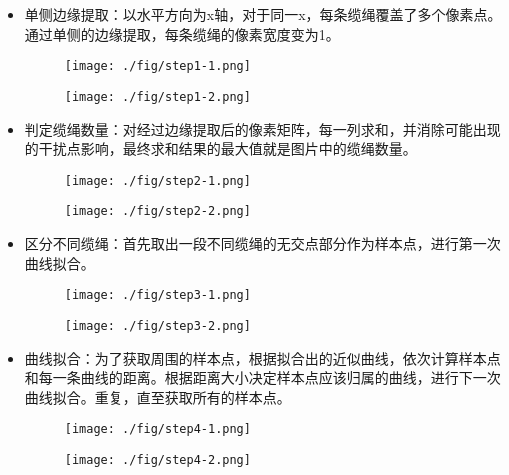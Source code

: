 \documentclass{article}
\begin{document}
\begin{itemize}
\item
  单侧边缘提取：以水平方向为x轴，对于同一x，每条缆绳覆盖了多个像素点。通过单侧的边缘提取，每条缆绳的像素宽度变为1。\\
  \begin{figure}[H]
  \begin{minipage}{0.5\linewidth}
  \centerline{\texttt{[image: ./fig/step1-1.png]}}
  \end{minipage}
  \hfill
  \begin{minipage}{0.5\linewidth}
  \centerline{\texttt{[image: ./fig/step1-2.png]}}
  \end{minipage}
  \end{figure}

\item
  判定缆绳数量：对经过边缘提取后的像素矩阵，每一列求和，并消除可能出现的干扰点影响，最终求和结果的最大值就是图片中的缆绳数量。\\
  \begin{figure}[H]
  \begin{minipage}{0.5\linewidth}
  \centerline{\texttt{[image: ./fig/step2-1.png]}}
  \end{minipage}
  \hfill
  \begin{minipage}{0.5\linewidth}
  \centerline{\texttt{[image: ./fig/step2-2.png]}}
  \end{minipage}
  \end{figure}

\item
  区分不同缆绳：首先取出一段不同缆绳的无交点部分作为样本点，进行第一次曲线拟合。\\
  \begin{figure}[H]
  \begin{minipage}{0.5\linewidth}
  \centerline{\texttt{[image: ./fig/step3-1.png]}}
  \end{minipage}
  \hfill
  \begin{minipage}{0.5\linewidth}
  \centerline{\texttt{[image: ./fig/step3-2.png]}}
  \end{minipage}
  \end{figure}

\item
  曲线拟合：为了获取周围的样本点，根据拟合出的近似曲线，依次计算样本点和每一条曲线的距离。根据距离大小决定样本点应该归属的曲线，进行下一次曲线拟合。重复，直至获取所有的样本点。\\
  \begin{figure}[H]
  \begin{minipage}{0.5\linewidth}
  \centerline{\texttt{[image: ./fig/step4-1.png]}}
  \end{minipage}
  \hfill
  \begin{minipage}{0.5\linewidth}
  \centerline{\texttt{[image: ./fig/step4-2.png]}}
  \end{minipage}
  \end{figure}


\end{itemize}
\end{document}
